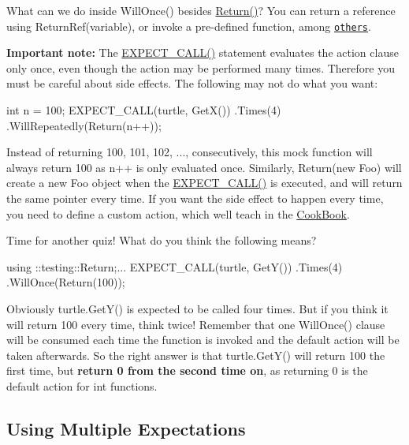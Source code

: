 What can we do inside {\ttfamily Will\+Once()} besides {\ttfamily \hyperlink{namespacetesting_af6d1c13e9376c77671e37545cd84359c}{Return()}}? You can return a reference using {\ttfamily Return\+Ref(variable)}, or invoke a pre-\/defined function, among \href{CheatSheet.md#actions}{\tt others}.

{\bfseries Important note\+:} The {\ttfamily \hyperlink{gmock-spec-builders_8h_a535a6156de72c1a2e25a127e38ee5232}{E\+X\+P\+E\+C\+T\+\_\+\+C\+A\+L\+L()}} statement evaluates the action clause only once, even though the action may be performed many times. Therefore you must be careful about side effects. The following may not do what you want\+:


\begin{DoxyCode}
int n = 100;
EXPECT\_CALL(turtle, GetX())
.Times(4)
.WillRepeatedly(Return(n++));
\end{DoxyCode}


Instead of returning 100, 101, 102, ..., consecutively, this mock function will always return 100 as {\ttfamily n++} is only evaluated once. Similarly, {\ttfamily Return(new Foo)} will create a new {\ttfamily Foo} object when the {\ttfamily \hyperlink{gmock-spec-builders_8h_a535a6156de72c1a2e25a127e38ee5232}{E\+X\+P\+E\+C\+T\+\_\+\+C\+A\+L\+L()}} is executed, and will return the same pointer every time. If you want the side effect to happen every time, you need to define a custom action, which we\textquotesingle{}ll teach in the \hyperlink{v1__7_2CookBook_8md}{Cook\+Book}.

Time for another quiz! What do you think the following means?


\begin{DoxyCode}
using ::testing::Return;...
EXPECT\_CALL(turtle, GetY())
.Times(4)
.WillOnce(Return(100));
\end{DoxyCode}


Obviously {\ttfamily turtle.\+Get\+Y()} is expected to be called four times. But if you think it will return 100 every time, think twice! Remember that one {\ttfamily Will\+Once()} clause will be consumed each time the function is invoked and the default action will be taken afterwards. So the right answer is that {\ttfamily turtle.\+Get\+Y()} will return 100 the first time, but {\bfseries return 0 from the second time on}, as returning 0 is the default action for {\ttfamily int} functions.

\subsection*{Using Multiple Expectations}

